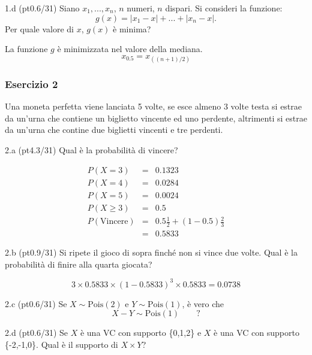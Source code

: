 \documentclass[
  10pt,
]{article}
\begin{document}
1.d (pt\hspace{.1em}0.6/31) Siano \(x_1,...,x_n\), \(n\) numeri, \(n\) dispari.
Si consideri la funzione:
\[g(x)=|x_1-x|+...+|x_n-x|.\]
Per quale valore di \(x\), \(g(x)\) è minima?

\begin{sol}
La funzione \(g\) è minimizzata nel valore della mediana.
\[x_{0.5}=x_{((n+1)/2)}\]

\end{sol}

\subsubsection{Esercizio 2}\label{esercizio-2}

Una moneta perfetta viene lanciata 5 volte, se esce almeno 3 volte testa si estrae da un'urna che contiene
un biglietto vincente ed uno perdente, altrimenti si estrae da un'urna che contine due biglietti vincenti e tre perdenti.

2.a (pt\hspace{.1em}4.3/31) Qual è la probabilità di vincere?

\begin{sol}
\begin{eqnarray*}
  P(X=3) &=& 0.1323\\
  P(X=4) &=& 0.0284\\
  P(X=5) &=& 0.0024\\
  P(X\ge 3)  &=& 0.5\\
  P(\text{Vincere})&=& 0.5\frac12+(1-0.5)\frac23\\
  &=& 0.5833
\end{eqnarray*}

\end{sol}

2.b (pt\hspace{.1em}0.9/31) Si ripete il gioco di sopra finché non si vince due volte. Qual è la probabilità di finire alla quarta giocata?

\begin{sol}
\[
3\times 0.5833\times (1-0.5833)^3\times 0.5833 = 0.0738
\]

\end{sol}

2.c (pt\hspace{.1em}0.6/31) Se \(X\sim \text{Pois}(2)\) e \(Y\sim\text{Pois}(1)\), è vero che
\[
X-Y\sim\text{Pois}(1)\qquad ?
\]

2.d (pt\hspace{.1em}0.6/31) Se \(X\) è una VC con supporto \{0,1,2\} e \(X\) è una VC con supporto \{-2,-1,0\}.
Qual è il supporto di \(X\times Y\)?
\end{document}

